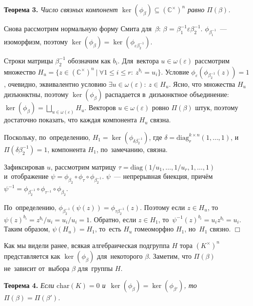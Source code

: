 \documentclass[twoside]{article}
\begin{document}
\medskip\noindent\textbf{Теорема 3.}\emph{
    Число связных компонент $\ker(\phi_\beta) \subseteq ({\mathbb{C}^\times})^n$ равно $\Pi(\beta)$.
}\medskip

    Снова рассмотрим нормальную форму Смита для~$\beta$: $\beta$ = $\beta_1^{-1} \varepsilon \beta_2^{-1}$.
    $\phi_{\beta_1^{-1}}$~— изоморфизм, поэтому $\ker(\phi_{\beta}) = \ker(\phi_{\varepsilon \beta_2^{-1}})$.

    Строки матрицы $\beta_2^{-1}$ обозначим как $b_i$.
    Для~вектора $u \in \omega(\varepsilon)$ рассмотрим множество $H_u = \{z \in ({\mathbb{C}^\times})^n \ | \ \forall 1 \leq i \leq r{:}\ z^{b_i} = u_i\}$.
    Условие $\phi_\varepsilon(\phi_{\beta_2^{-1}}(z)) = 1$, очевидно, эквивалентно условию $\exists u \in \omega(\varepsilon){:}\ z \in H_u$.
    Ясно, что множества $H_u$ дизъюнктны, поэтому $\ker(\phi_{\beta})$ распадается в~дизъюнктное объединение:
    $
        \ker(\phi_{\beta}) = \bigsqcup_{u \in \omega(\varepsilon)} H_u.
    $
    Векторов $u \in \omega(\varepsilon)$ ровно $\Pi(\beta)$ штук, поэтому достаточно показать, что каждая компонента $H_u$ связна.

    Поскольку, по~определению, $H_1 = \ker(\phi_{\delta \beta_2^{-1}})$, где $\delta = \mathrm{diag}^{k \times n}_r(1, \ldots, 1)$,
    и~$\Pi(\delta \beta_2^{-1}) = 1$, компонента $H_1$, по~замечанию, связна.

    Зафиксировав $u$, рассмотрим матрицу $\tau = \mathrm{diag}(1 / u_1, \ldots, 1 / u_r, 1, \ldots, 1)$ и~отображение $\psi = \phi_{\beta_2} \circ \phi_\tau \circ \phi_{\beta_2^{-1}}$.
    $\psi$~— непрерывная биекция, причём $\psi^{-1} = \phi_{\beta_2^{-1}} \circ \phi_{\tau^{-1}} \circ \phi_{\beta_2}$.

    По~определению, $\phi_{\beta_2^{-1}}(\psi(z)) = \phi_{\tau \beta_2^{-1}}(z)$.
    Поэтому если $z \in H_u$, то~$\psi(z)^{b_i} = z^{b_i} / u_i = u_i / u_i = 1$. Обратно, если $z \in H_1$,
    то~$\psi^{-1}(z)^{b_i} = u_i z^{b_i} = u_i$. Таким образом, $\psi(H_u) = H_1$,
    то~есть $H_u$ гомеоморфно $H_1$, но~$H_1$ связно.
\hfill$\Box$\medskip

Как мы видели ранее, всякая алгебраическая подгруппа $H$ тора $(K^\times)^n$ представляется как $\ker(\phi_\beta)$
для~некоторого $\beta$. Заметим, что $\Pi(\beta)$ не~зависит от~выбора $\beta$ для~группы $H$.

\medskip\noindent\textbf{Теорема 4.}\emph{
    Если $\mathrm{char}(K) = 0$ и~$\ker(\phi_{\beta}) = \ker(\phi_{\beta'})$, то~$\Pi(\beta) = \Pi(\beta')$.
}\medskip
\end{document}
